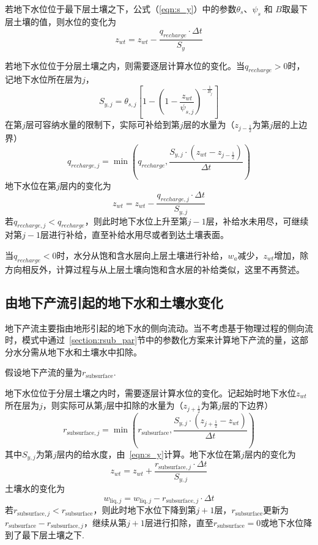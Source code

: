 若地下水位位于最下层土壤之下，公式（\ref{eqn:s_y}）中的参数$\theta_s$、$\psi_s$ 和 $B$取最下层土壤的值，则水位的变化为
\begin{equation}
z_{w t}=z_{w t}-\frac{q_{recharge} \cdot \Delta t}{S_{y}}
\end{equation}

若地下水位位于分层土壤之内，则需要逐层计算水位的变化。当$q_{recharge}>0$时，记地下水位所在层为$j$，
\begin{equation}
{S}_{y,j}=\theta_{s,j}\left[1-\left(1-\frac{z_{wt}}{\psi_{s,j}}\right)^{-\frac{1}{B_j}}\right]
\end{equation}
在第$j$层可容纳水量的限制下，实际可补给到第$j$层的水量为（$z_{j-\frac{1}{2}}$为第$j$层的上边界）
\begin{equation}
q_{recharge, j}=\min \left(q_{recharge}, \frac{S_{y,j} \cdot \left(z_{w t}-z_{j-\frac{1}{2}}\right)}{\Delta t} \right)  
\end{equation}
地下水位在第$j$层内的变化为
\begin{equation}
z_{w t}=z_{w t}-\frac{q_{recharge,j} \cdot \Delta t}{S_{y,j}}
\end{equation}
若$q_{recharge,j}<q_{recharge}$，则此时地下水位上升至第$j-1$层，补给水未用尽，可继续对第$j-1$层进行补给，直至补给水用尽或者到达土壤表面。

当$q_{recharge}<0$时，水分从饱和含水层向上层土壤进行补给，$w_a$减少，$z_{wt}$增加，除方向相反外，计算过程与从上层土壤向饱和含水层的补给类似，这里不再赘述。

\subsection{由地下产流引起的地下水和土壤水变化}

地下产流主要指由地形引起的地下水的侧向流动。当不考虑基于物理过程的侧向流时，模式中通过~\ref{section:rsub_par}节中的参数化方案来计算地下产流的量，这部分水分需从地下水和土壤水中扣除。

假设地下产流的量为$r_{\mathrm{subsurface}}$.

地下水位位于分层土壤之内时，需要逐层计算水位的变化。记起始时地下水位$z_{wt}$所在层为$j$，则实际可从第$j$层中扣除的水量为（$z_{j+\frac{1}{2}}$为第$j$层的下边界）
\begin{equation}
r_{\mathrm{subsurface},j} = \min \left(r_{\mathrm{subsurface}}, \frac{S_{y,j} \cdot \left(z_{j+\frac{1}{2}} - z_{w t}\right)}{\Delta t} \right)  
\end{equation}
其中$S_{y,j}$为第$j$层内的给水度，由~\eqref{eqn:s_y}计算。地下水位在第$j$层内的变化为
\begin{equation}
z_{w t}=z_{w t}+\frac{r_{\mathrm{subsurface},j} \cdot \Delta t}{S_{y,j}}
\end{equation}
土壤水的变化为
\begin{equation}
    w_{\mathrm{liq},j} =  w_{\mathrm{liq},j} - r_{\mathrm{subsurface},j} \cdot \Delta t
\end{equation}
若$r_{\mathrm{subsurface},j}<r_{\mathrm{subsurface}}$，则此时地下水位下降到第$j+1$层，$r_{\mathrm{subsurface}}$更新为$r_{\mathrm{subsurface}}-r_{\mathrm{subsurface},j}$，继续从第$j+1$层进行扣除，直至$r_{\mathrm{subsurface}}=0$或地下水位降到了最下层土壤之下.

